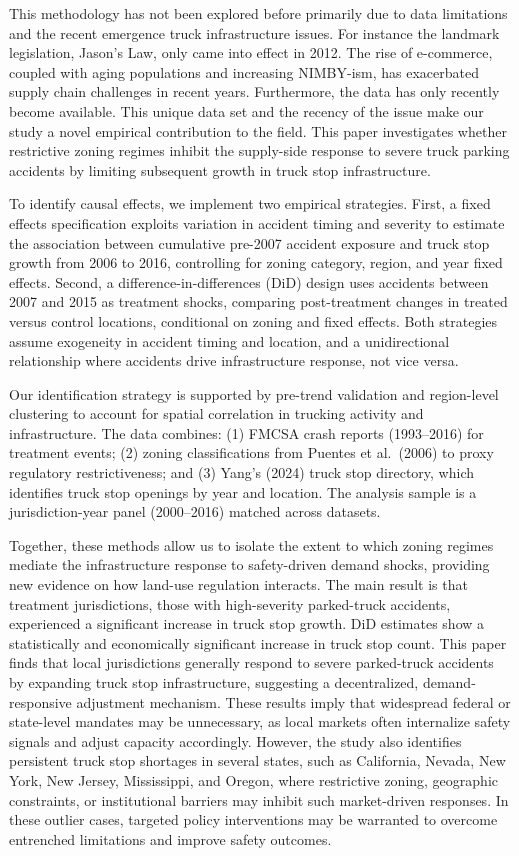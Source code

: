 \documentclass[
  12pt]{article}
\begin{document}
This methodology has not been explored before primarily due to data
limitations and the recent emergence truck infrastructure issues. For
instance the landmark legislation, Jason's Law, only came into effect in
2012. The rise of e-commerce, coupled with aging populations and
increasing NIMBY-ism, has exacerbated supply chain challenges in recent
years. Furthermore, the data has only recently become available. This
unique data set and the recency of the issue make our study a novel
empirical contribution to the field. This paper investigates whether
restrictive zoning regimes inhibit the supply-side response to severe
truck parking accidents by limiting subsequent growth in truck stop
infrastructure.

To identify causal effects, we implement two empirical strategies.
First, a fixed effects specification exploits variation in accident
timing and severity to estimate the association between cumulative
pre-2007 accident exposure and truck stop growth from 2006 to 2016,
controlling for zoning category, region, and year fixed effects. Second,
a difference-in-differences (DiD) design uses accidents between 2007 and
2015 as treatment shocks, comparing post-treatment changes in treated
versus control locations, conditional on zoning and fixed effects. Both
strategies assume exogeneity in accident timing and location, and a
unidirectional relationship where accidents drive infrastructure
response, not vice versa.

Our identification strategy is supported by pre-trend validation and
region-level clustering to account for spatial correlation in trucking
activity and infrastructure. The data combines: (1) FMCSA crash reports
(1993--2016) for treatment events; (2) zoning classifications from
Puentes et al.~(2006) to proxy regulatory restrictiveness; and (3)
Yang's (2024) truck stop directory, which identifies truck stop openings
by year and location. The analysis sample is a jurisdiction-year panel
(2000--2016) matched across datasets.

Together, these methods allow us to isolate the extent to which zoning
regimes mediate the infrastructure response to safety-driven demand
shocks, providing new evidence on how land-use regulation interacts. The
main result is that treatment jurisdictions, those with high-severity
parked-truck accidents, experienced a significant increase in truck stop
growth. DiD estimates show a statistically and economically significant
increase in truck stop count. This paper finds that local jurisdictions
generally respond to severe parked-truck accidents by expanding truck
stop infrastructure, suggesting a decentralized, demand-responsive
adjustment mechanism. These results imply that widespread federal or
state-level mandates may be unnecessary, as local markets often
internalize safety signals and adjust capacity accordingly. However, the
study also identifies persistent truck stop shortages in several states,
such as California, Nevada, New York, New Jersey, Mississippi, and
Oregon, where restrictive zoning, geographic constraints, or
institutional barriers may inhibit such market-driven responses. In
these outlier cases, targeted policy interventions may be warranted to
overcome entrenched limitations and improve safety outcomes.
\end{document}
